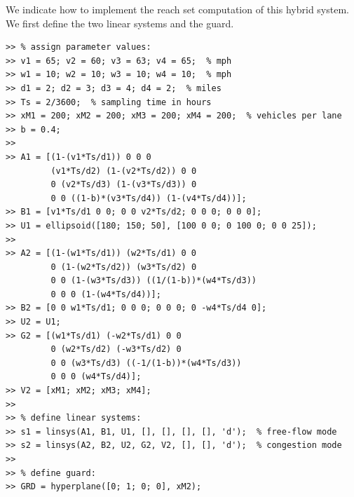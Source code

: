 We indicate how to implement the reach set computation of this hybrid system.
We first define the two linear systems and the guard.
{\tt \begin{verbatim}
>> % assign parameter values:
>> v1 = 65; v2 = 60; v3 = 63; v4 = 65;  % mph
>> w1 = 10; w2 = 10; w3 = 10; w4 = 10;  % mph
>> d1 = 2; d2 = 3; d3 = 4; d4 = 2;  % miles
>> Ts = 2/3600;  % sampling time in hours
>> xM1 = 200; xM2 = 200; xM3 = 200; xM4 = 200;  % vehicles per lane
>> b = 0.4;
>>
>> A1 = [(1-(v1*Ts/d1)) 0 0 0
         (v1*Ts/d2) (1-(v2*Ts/d2)) 0 0
         0 (v2*Ts/d3) (1-(v3*Ts/d3)) 0
         0 0 ((1-b)*(v3*Ts/d4)) (1-(v4*Ts/d4))];
>> B1 = [v1*Ts/d1 0 0; 0 0 v2*Ts/d2; 0 0 0; 0 0 0];
>> U1 = ellipsoid([180; 150; 50], [100 0 0; 0 100 0; 0 0 25]);
>>
>> A2 = [(1-(w1*Ts/d1)) (w2*Ts/d1) 0 0
         0 (1-(w2*Ts/d2)) (w3*Ts/d2) 0
         0 0 (1-(w3*Ts/d3)) ((1/(1-b))*(w4*Ts/d3))
         0 0 0 (1-(w4*Ts/d4))];
>> B2 = [0 0 w1*Ts/d1; 0 0 0; 0 0 0; 0 -w4*Ts/d4 0];
>> U2 = U1;
>> G2 = [(w1*Ts/d1) (-w2*Ts/d1) 0 0
         0 (w2*Ts/d2) (-w3*Ts/d2) 0
         0 0 (w3*Ts/d3) ((-1/(1-b))*(w4*Ts/d3))
         0 0 0 (w4*Ts/d4)];
>> V2 = [xM1; xM2; xM3; xM4];
>>
>> % define linear systems:
>> s1 = linsys(A1, B1, U1, [], [], [], [], 'd');  % free-flow mode
>> s2 = linsys(A2, B2, U2, G2, V2, [], [], 'd');  % congestion mode
>>
>> % define guard:
>> GRD = hyperplane([0; 1; 0; 0], xM2);
\end{verbatim}}

